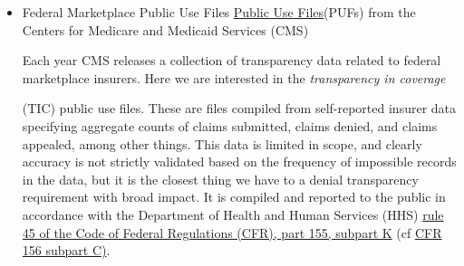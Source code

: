 \documentclass[12pt, a4paper,twoside,parskip=full]{report}
\theoremstyle{plain} %
\theoremstyle{definition} %
\theoremstyle{remark} %
\numberwithin{equation}{chapter}
\begin{document}
		\begin{itemize}
			\item Federal Marketplace Public Use Files \href{https://www.cms.gov/cciio/resources/data-resources/marketplace-puf}{Public Use Files}(PUFs) from the Centers for Medicare and Medicaid Services (CMS)\\
			
			\begin{tcolorbox}
			Each year CMS releases a collection of transparency data related to federal marketplace insurers. Here we are interested in the \emph{transparency in coverage}  
			(TIC) public use files. These are files compiled from self-reported insurer data specifying aggregate counts of claims submitted, claims denied, and claims appealed, among other things. This data is limited in scope, and clearly accuracy is not strictly validated based on the frequency of impossible records in the data, but it is the closest thing we have to a denial transparency requirement with broad impact. It is compiled and reported to the public in accordance with the Department of Health and Human Services (HHS) \href{https://www.ecfr.gov/current/title-45/subtitle-A/subchapter-B/part-155/subpart-K/section-155.1040}{rule 45 of the Code of Federal Regulations (CFR), part 155, subpart K} (cf \href{https://www.ecfr.gov/current/title-45/subtitle-A/subchapter-B/part-156/subpart-C/section-156.220}{CFR 156 subpart C)}.
			

\end{tcolorbox}
\end{itemize}
\end{document}
